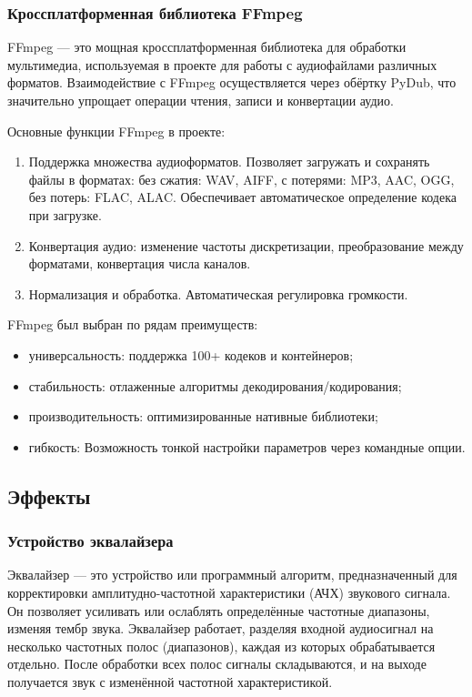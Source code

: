 \subsubsection{Кроссплатформенная библиотека FFmpeg}

FFmpeg — это мощная кроссплатформенная библиотека для обработки мультимедиа, используемая в проекте для работы с аудиофайлами различных форматов. Взаимодействие с FFmpeg осуществляется через обёртку PyDub, что значительно упрощает операции чтения, записи и конвертации аудио.

Основные функции FFmpeg в проекте:
\begin{enumerate}
	\item Поддержка множества аудиоформатов. Позволяет загружать и сохранять файлы в форматах: без сжатия: WAV, AIFF, с потерями: MP3, AAC, OGG, без потерь: FLAC, ALAC. Обеспечивает автоматическое определение кодека при загрузке.
	\item Конвертация аудио: изменение частоты дискретизации, преобразование между форматами, конвертация числа каналов.
	\item Нормализация и обработка. Автоматическая регулировка громкости.
\end{enumerate}

FFmpeg был выбран по рядам преимуществ:
\begin{itemize}
	\item универсальность: поддержка 100+ кодеков и контейнеров;
	\item стабильность: отлаженные алгоритмы декодирования/кодирования;
	\item производительность: оптимизированные нативные библиотеки;
	\item гибкость: Возможность тонкой настройки параметров через командные опции.
\end{itemize}

\subsection{Эффекты}

\subsubsection{Устройство эквалайзера}

Эквалайзер — это устройство или программный алгоритм, предназначенный для корректировки амплитудно-частотной характеристики (АЧХ) звукового сигнала. Он позволяет усиливать или ослаблять определённые частотные диапазоны, изменяя тембр звука. Эквалайзер работает, разделяя входной аудиосигнал на несколько частотных полос (диапазонов), каждая из которых обрабатывается отдельно. После обработки всех полос сигналы складываются, и на выходе получается звук с изменённой частотной характеристикой.

